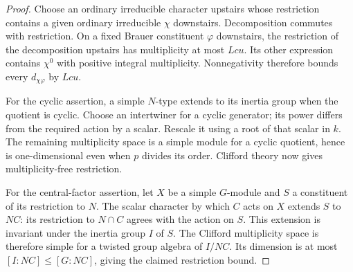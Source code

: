 \begin{proof}
Choose an ordinary irreducible character upstairs whose restriction
contains a given ordinary irreducible \(\chi\) downstairs.
Decomposition commutes with restriction.  On a fixed Brauer
constituent \(\varphi\) downstairs, the restriction of the
decomposition upstairs has multiplicity at most \(Lcu\).
Its other expression contains \(\chi^0\) with positive integral
multiplicity.  Nonnegativity therefore bounds every
\(d_{\chi\varphi}\) by \(Lcu\).

For the cyclic assertion, a simple \(N\)-type extends to its inertia
group when the quotient is cyclic.  Choose an intertwiner for a
cyclic generator; its power differs from the required action by a
scalar.  Rescale it using a root of that scalar in \(k\).
The remaining multiplicity space is a simple module for a cyclic
quotient, hence is one-dimensional even when \(p\) divides its order.
Clifford theory now gives multiplicity-free restriction.

For the central-factor assertion, let \(X\) be a simple
\(G\)-module and \(S\) a constituent of its restriction to \(N\).
The scalar character by which \(C\) acts on \(X\) extends \(S\)
to \(NC\): its restriction to \(N\cap C\) agrees with the
action on \(S\).  This extension is invariant under the inertia
group \(I\) of \(S\).  The Clifford multiplicity space is
therefore simple for a twisted group algebra of \(I/NC\).
Its dimension is at most \([I:NC]\le [G:NC]\), giving the
claimed restriction bound.
\end{proof}
